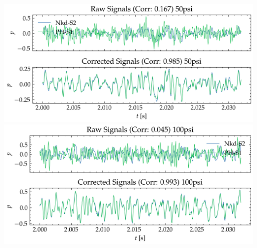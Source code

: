\documentclass[aspectratio=169,10pt]{beamer}
\begin{document}
\begin{frame}
\begin{columns}[c]
            \includegraphics[width=\linewidth]{PH-NKD/y_50psi.png}
            \includegraphics[width=\linewidth]{PH-NKD/y_100psi.png}
    \end{columns}
\end{frame}
\end{document}
